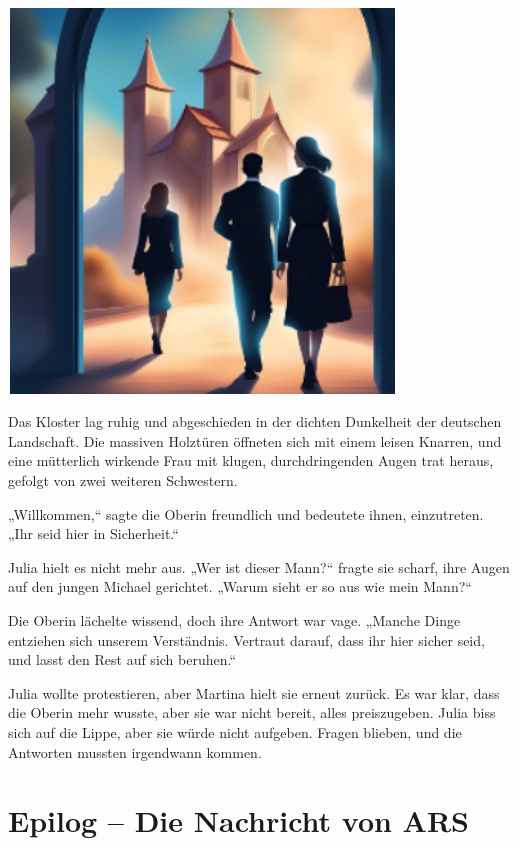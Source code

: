 \documentclass[
]{article}
\begin{document}
\includegraphics[width=4.04843in,height=4.01776in]{media/image5.png}

Das Kloster lag ruhig und abgeschieden in der dichten Dunkelheit der
deutschen Landschaft. Die massiven Holztüren öffneten sich mit einem
leisen Knarren, und eine mütterlich wirkende Frau mit klugen,
durchdringenden Augen trat heraus, gefolgt von zwei weiteren Schwestern.

„Willkommen,`` sagte die Oberin freundlich und bedeutete ihnen,
einzutreten. „Ihr seid hier in Sicherheit.``

Julia hielt es nicht mehr aus. „Wer ist dieser Mann?{\kern0pt}`` fragte
sie scharf, ihre Augen auf den jungen Michael gerichtet. „Warum sieht er
so aus wie mein Mann?{\kern0pt}``

Die Oberin lächelte wissend, doch ihre Antwort war vage. „Manche Dinge
entziehen sich unserem Verständnis. Vertraut darauf, dass ihr hier
sicher seid, und lasst den Rest auf sich beruhen.``

Julia wollte protestieren, aber Martina hielt sie erneut zurück. Es war
klar, dass die Oberin mehr wusste, aber sie war nicht bereit, alles
preiszugeben. Julia biss sich auf die Lippe, aber sie würde nicht
aufgeben. Fragen blieben, und die Antworten mussten irgendwann kommen.

\section{Epilog -- Die Nachricht von
ARS}\label{epilog-die-nachricht-von-ars}
\end{document}
